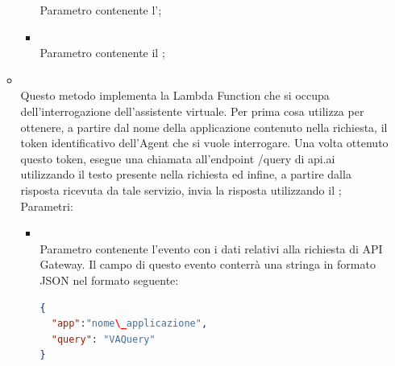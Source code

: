 \begin{itemize}
\begin{itemize}
\begin{itemize}
			Parametro contenente l';
			\item {} \\
			Parametro contenente il ;
		\end{itemize}
		\item[]  \\		Questo metodo implementa la Lambda Function che si occupa dell'interrogazione dell'assistente virtuale. Per prima cosa utilizza  per ottenere, a partire dal nome della applicazione contenuto nella richiesta, il token identificativo dell'Agent che si vuole interrogare. Una volta ottenuto questo token, esegue una chiamata all'endpoint /query di api.ai  utilizzando il testo presente nella richiesta ed infine, a partire dalla risposta ricevuta da tale servizio, invia la risposta utilizzando il ;\\
		Parametri:
		\begin{itemize}
			\item {} \\
			Parametro contenente l'evento con i dati relativi alla richiesta di API Gateway. Il campo  di questo evento conterrà una stringa in formato JSON nel formato seguente:

\begin{lstlisting}[language=json,firstnumber=1]
{
  "app":"nome\_applicazione",
  "query": "VAQuery"
}
\end{lstlisting}


\end{itemize}
\end{itemize}
\end{itemize}
